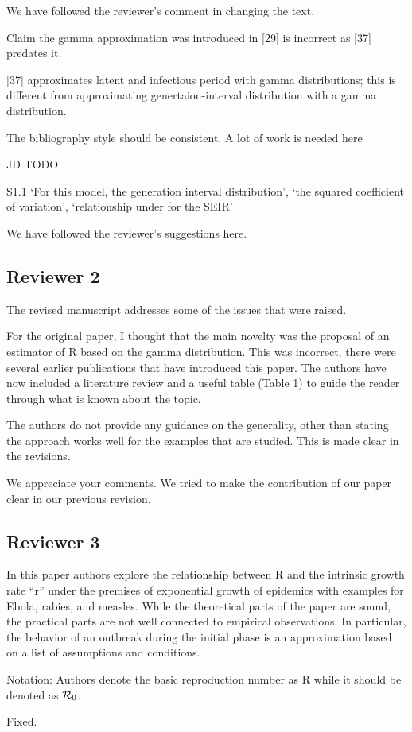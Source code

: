 \documentclass[12pt]{article}
\newcommand{\Rx}[1]{\ensuremath{{\cal R}_{#1}}}
\newcommand{\Ro}{\Rx{0}}
\newcommand{\rev}{\subsection*}
\newcommand{\revtext}{\textsf}
\begin{document}
We have followed the reviewer's comment in changing the text.

\revtext{Claim the gamma approximation was introduced in [29] is incorrect as [37] predates it.}

[37] approximates latent and infectious period with gamma distributions; this is different from approximating genertaion-interval distribution with a gamma distribution.

\revtext{The bibliography style should be consistent. A lot of work is needed here}

JD TODO

\revtext{S1.1 ‘For this model, the generation interval distribution’, ‘the squared coefficient of variation’, ‘relationship under for the SEIR’}

We have followed the reviewer's suggestions here. 

\rev{Reviewer 2}

\revtext{The revised manuscript addresses some of the issues that were raised.}

\revtext{For the original paper, I thought that the main novelty was the
proposal of an estimator of R based on the gamma distribution. This
was incorrect, there were several earlier publications that have
introduced this paper. The authors have now included a literature
review and a useful table (Table 1) to guide the reader through what
is known about the topic.}

\revtext{The authors do not provide any guidance on the generality, other than
stating the approach works well for the examples that are studied.
This is made clear in the revisions.}

We appreciate your comments. We tried to make the contribution of our paper clear in our previous revision.

\rev{Reviewer 3}

\revtext{In this paper authors explore the relationship between R and the
intrinsic growth rate ``r'' under the premises of exponential growth of
epidemics with examples for Ebola, rabies, and measles. While the
theoretical parts of the paper are sound, the practical parts are not
well connected to empirical observations. In particular, the behavior
of an outbreak during the initial phase is an approximation based on a
list of assumptions and conditions.}

\revtext{Notation: Authors denote the basic reproduction number as R while it should be denoted as \Ro.}

Fixed.
\end{document}
